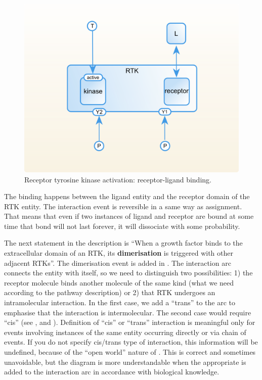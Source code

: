 \begin{figure}[H]
  \centering
  \vspace*{-0.75em}
  \includegraphics[scale=0.75]{examples/rtk-binding.png}
   \caption{Receptor tyrosine kinase activation: receptor-ligand binding.}
  \label{fig:rtk-binding}
\end{figure}

The binding happens between the ligand entity and the receptor domain of the RTK entity. The interaction event is reversible in a same way as assignment. That means that even if two instances of ligand and receptor are bound at some time that bond will not last forever, it will dissociate with some probability.

The next statement in the description is ``When a growth factor binds to the extracellular domain of an RTK, its \textbf{dimerisation} is triggered with other adjacent RTKs''. The dimerisation event is added in . The interaction arc connects the entity with itself, so we need to distinguish two possibilities: 1) the receptor molecule binds another molecule of the same kind (what we need according to the pathway description) or 2) that RTK undergoes an intramolecular interaction. In the first case, we add a  ``trans'' to the arc to emphasise that the interaction is intermolecular. The second case would require  ``cis'' (see ,  and ). Definition of ``cis'' or ``trans'' interaction is meaningful only for events involving instances of the same entity occurring directly or via chain of events. If you do not specify cis/trans type of interaction, this information will be undefined, because of the ``open world'' nature of \SBGNERLone. This is correct and sometimes unavoidable, but the diagram is more understandable when the appropriate  is added to the interaction arc in accordance with biological knowledge.

